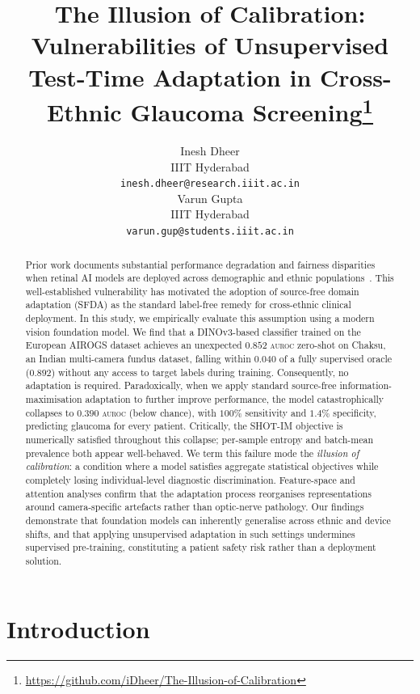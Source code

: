 \documentclass[11pt]{article}
\title{The Illusion of Calibration: Vulnerabilities of Unsupervised\\
       Test-Time Adaptation in Cross-Ethnic Glaucoma Screening\thanks{\url{https://github.com/iDheer/The-Illusion-of-Calibration}}}
\author{Inesh Dheer \\
  IIIT Hyderabad \\
  \texttt{inesh.dheer@research.iiit.ac.in} \\\And
  Varun Gupta \\
  IIIT Hyderabad \\
  \texttt{varun.gup@students.iiit.ac.in}}
\date{}
\newcommand{\src}{AIROGS}
\newcommand{\auroc}{\textsc{auroc}}
\begin{document}
\maketitle

\begin{abstract}
Prior work documents substantial performance degradation and fairness
disparities when retinal AI models are deployed across demographic and 
ethnic populations~\cite{wang2025,fairDomain2024}. This well-established
vulnerability has motivated the adoption of source-free domain
adaptation (SFDA) as the standard label-free remedy for cross-ethnic
clinical deployment. In this study, we empirically evaluate this assumption
using a modern vision foundation model. We find that a DINOv3-based
classifier trained on the European \src{} dataset achieves an unexpected
$0.852$ \auroc{} zero-shot on Chaksu, an Indian multi-camera fundus dataset,
falling within $0.040$ of a fully supervised oracle ($0.892$) without any 
access to target labels during training. Consequently, no adaptation is 
required. Paradoxically, when we apply standard source-free information-maximisation 
adaptation to further improve performance, the model catastrophically collapses 
to $0.390$ \auroc{} (below chance), with $100\%$ sensitivity
and $1.4\%$ specificity, predicting glaucoma for every patient.
Critically, the SHOT-IM objective is numerically satisfied throughout this
collapse; per-sample entropy and batch-mean prevalence both appear
well-behaved. We term this failure mode the \textit{illusion of
calibration}: a condition where a model satisfies aggregate statistical objectives
while completely losing individual-level diagnostic discrimination. Feature-space
and attention analyses confirm that the adaptation process reorganises
representations around camera-specific artefacts rather than optic-nerve
pathology. Our findings demonstrate that foundation models can inherently generalise across
ethnic and device shifts, and that applying unsupervised adaptation in such 
settings undermines supervised pre-training, constituting a patient
safety risk rather than a deployment solution.
\end{abstract}

\section{Introduction}
\label{sec:intro}
\end{document}
